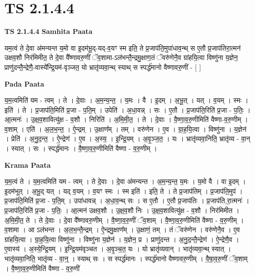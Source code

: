 \documentclass[17pt]{extarticle}
\begin{document}
\section{ TS 2.1.4.4 }

\textbf{TS 2.1.4.4 } \newline
\textbf{Samhita Paata} \newline

यम॒त्वं ते दे॒वा अ॑मन्यन्त य॒मो वा इ॒दम॑भू॒द्-यद्-व॒यꣳ स्म इति॒ ते प्र॒जाप॑ति॒मुपा॑धाव॒न्थ् स ए॒तौ प्र॒जाप॑तिरा॒त्मन॑ उक्षव॒शौ निर॑मिमीत॒ ते दे॒वा वै᳚ष्णावरु॒णीं ॅव॒शामा-ऽल॑भन्तै॒न्द्रमु॒क्षाण॒तं ॅवरु॑णेनै॒व ग्रा॑हयि॒त्वा विष्णु॑ना य॒ज्ञेन॒ प्राणु॑दन्तै॒न्द्रेणै॒-वास्ये᳚न्द्रि॒यम॑-वृञ्जत॒ यो भ्रातृ॑व्यवा॒न्थ् स्याथ् स स्पर्द्ध॑मानो वैष्णावरु॒णीं - [  ] \newline

\textbf{Pada Paata} \newline

य॒म॒त्वमिति॑ यम - त्वम् । ते । दे॒वाः । अ॒म॒न्य॒न्त॒ । य॒मः । वै । इ॒दम् । अ॒भू॒त् । यत् । व॒यम् । स्मः । इति॑ । ते । प्र॒जाप॑ति॒मिति॑ प्र॒जा - प॒ति॒म् । उपेति॑ । अ॒धा॒वन्न् । सः । ए॒तौ । प्र॒जाप॑ति॒रिति॑ प्र॒जा - प॒तिः॒ । आ॒त्मनः॑ । उ॒क्ष॒व॒शावित्यु॑क्ष - व॒शौ । निरिति॑ । अ॒मि॒मी॒त॒ । ते । दे॒वाः । वै॒ष्णा॒व॒रु॒णीमिति॑ वैष्णा-व॒रु॒णीम् । व॒शाम् । एति॑ । अ॒ल॒भ॒न्त॒ । ऐ॒न्द्रम् । उ॒क्षाण᳚म् । तम् । वरु॑णेन । ए॒व । ग्रा॒ह॒यि॒त्वा । विष्णु॑ना । य॒ज्ञेन॑ । प्रेति॑ । अ॒नु॒द॒न्त॒ । ऐ॒न्द्रेण॑ । ए॒व । अ॒स्य॒ । इ॒न्द्रि॒यम् । अ॒वृ॒ञ्ज॒त॒ । यः । भ्रातृ॑व्यवा॒निति॒ भ्रातृ॑व्य - वा॒न् । स्यात् । सः । स्पर्द्ध॑मानः । वै॒ष्णा॒व॒रु॒णीमिति॑ वैष्णा - व॒रु॒णीम् ।  \newline


\textbf{Krama Paata} \newline

य॒म॒त्वं ते । य॒म॒त्वमिति॑ यम - त्वम् । ते दे॒वाः । दे॒वा अ॑मन्यन्त । अ॒म॒न्य॒न्त॒ य॒मः । य॒मो वै । वा इ॒दम् । इ॒दम॑भूत् । अ॒भू॒द् यत् । यद् व॒यम् । व॒यꣳ स्मः । स्म इति॑ । इति॒ ते । ते प्र॒जाप॑तिम् । प्र॒जाप॑ति॒मुप॑ । प्र॒जाप॑ति॒मिति॑ प्र॒जा - प॒ति॒म् । उपा॑धावन्न् । अ॒धा॒व॒न्थ् सः । स ए॒तौ । ए॒तौ प्र॒जाप॑तिः । प्र॒जाप॑ति,रा॒त्मनः॑ । प्र॒जाप॑ति॒रिति॑ प्र॒जा - प॒तिः॒ । आ॒त्मन॑ उक्षव॒शौ । उ॒क्ष॒व॒शौ निः । उ॒क्ष॒व॒शावित्यु॑क्ष - व॒शौ । निर॑मिमीत । अ॒मि॒मी॒त॒ ते । ते दे॒वाः । दे॒वा वै᳚ष्णावरु॒णीम् । वै॒ष्णा॒व॒रु॒णीं ॅव॒शाम् । वै॒ष्णा॒व॒रु॒णीमिति॑ वैष्णा - व॒रु॒णीम् । व॒शामा । आ ऽल॑भन्त । अ॒ल॒भ॒न्तै॒न्द्रम् । ऐ॒न्द्रमु॒क्षाण᳚म् । उ॒क्षाणं॒ तम् । तं ॅवरु॑णेन । वरु॑णेनै॒व । ए॒व ग्रा॑हयि॒त्वा । ग्रा॒ह॒यि॒त्वा विष्णु॑ना । विष्णु॑ना य॒ज्ञेन॑ । य॒ज्ञेन॒ प्र । प्राणु॑दन्त । अ॒नु॒द॒न्तै॒न्द्रेण॑ । ऐ॒न्द्रेणै॒व । ए॒वास्य॑ । अ॒स्ये॒न्द्रि॒यम् । इ॒न्द्रि॒यम॑वृञ्चत । अ॒वृ॒ञ्च॒त॒ यः । यो भ्रातृ॑व्यवान् । भातृ॑व्यवा॒न्थ् स्यात् । भातृ॑व्यवा॒निति॒ भातृ॑व्य - वा॒न्॒ । स्याथ् सः । स स्पर्द्ध॑मानः । स्पर्द्ध॑मानो वैष्णावरु॒णीम् । वै॒षा॒॒व॒रु॒णीं ॅव॒शाम् । वै॒ष्णा॒व॒रु॒णीमिति॑ वैष्णा - व॒रु॒णीं \newline
\end{document}
